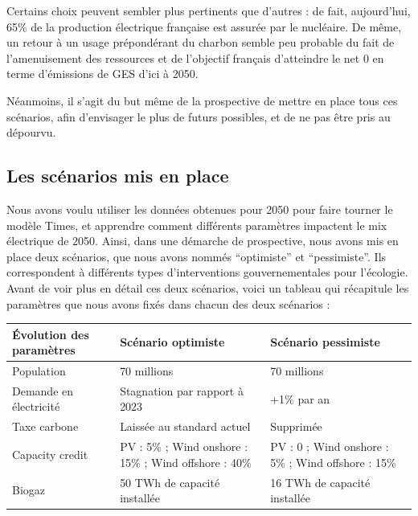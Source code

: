 \documentclass{article}
\theoremstyle{nopointbreak}
\theoremstyle{nobrkbold}
\begin{document}
Certains choix peuvent sembler plus pertinents que d'autres : de fait, aujourd'hui, 65\% de la production électrique française est assurée par le nucléaire. De même, un retour à un usage prépondérant du charbon semble peu probable du fait de l'amenuisement des ressources et de l'objectif français d'atteindre le net 0 en terme d'émissions de GES d'ici à 2050.


Néanmoins, il s’agit du but même de la prospective de mettre en place tous ces scénarios, afin d’envisager le plus de futurs possibles, et de ne pas être pris au dépourvu.

\subsection{Les scénarios mis en place}

Nous avons voulu utiliser les données obtenues pour 2050 pour faire tourner le modèle Times, et apprendre comment différents paramètres impactent le mix électrique de 2050. Ainsi, dans une démarche de prospective, nous avons mis en place deux scénarios, que nous avons nommés “optimiste” et “pessimiste”. 
Ils correspondent à différents types d'interventions gouvernementales pour l’écologie. \\

Avant de voir plus en détail ces deux scénarios, voici un tableau qui récapitule les paramètres que nous avons fixés dans chacun des deux scénarios : \\

\begin{center}
\begin{tabular}{|m{4cm}|m{4cm}|m{4cm}|}
   \hline
   Évolution des paramètres & Scénario optimiste & Scénario pessimiste \\
   \hline
   Population & 70 millions & 70 millions \\
   \hline
   Demande en électricité & Stagnation par rapport à 2023 &  +1\% par an \\
   \hline
   Taxe carbone & Laissée au standard actuel & Supprimée \\
   \hline
   Capacity credit & PV : 5\% ; Wind onshore : 15\%  ; Wind offshore : 40\% & PV : 0 ; Wind onshore : 5\% ; Wind offshore : 15\% \\
   \hline
   Biogaz & 50 TWh de capacité installée & 16 TWh de capacité installée\\
   \hline
\end{tabular}
\end{center}
\end{document}
